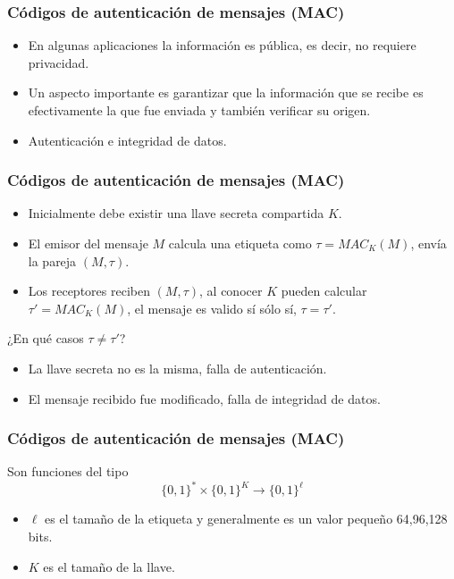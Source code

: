 \documentclass{beamer}
\newcommand{\binStr}{\{0,1\}}
\begin{document}
\frame
{
	\frametitle{Códigos de autenticación de mensajes (MAC)}
	
\begin{itemize}
\item En algunas aplicaciones la información es pública, es decir, no requiere privacidad.\\
\item Un aspecto importante es garantizar que la información que se recibe es efectivamente la que fue enviada y también verificar su origen.\\
\item Autenticación e integridad de datos.
\end{itemize}	
}

\frame
{
	\frametitle{Códigos de autenticación de mensajes (MAC)}
	
\begin{itemize}
\item Inicialmente debe existir una llave secreta compartida $K$.\\
\item El emisor del mensaje $M$ calcula una etiqueta como $\tau=MAC_K(M)$, envía la pareja $(M,\tau)$.\\
\item Los receptores reciben $(M,\tau)$, al conocer $K$ pueden calcular $\tau'=MAC_K(M)$, el mensaje es valido sí sólo sí, $\tau=\tau'$. 
\end{itemize}	

{\color{red} ¿En qué casos $\tau\neq \tau'$?}
\pause
\begin{itemize}
\item La llave secreta no es la misma, falla de autenticación.\\ \pause
\item El mensaje recibido fue modificado, falla de integridad de datos. 
\end{itemize}

}

\frame
{
	\frametitle{Códigos de autenticación de mensajes (MAC)}

Son funciones del tipo 
$$\binStr^* \times \binStr^K \rightarrow \binStr^{\ell}$$

\begin{itemize}
\item $\ell$ es el tamaño de la etiqueta y generalmente es un valor pequeño 64,96,128 bits.
\item $K$ es el tamaño de la llave.
\end{itemize}

}
\end{document}
